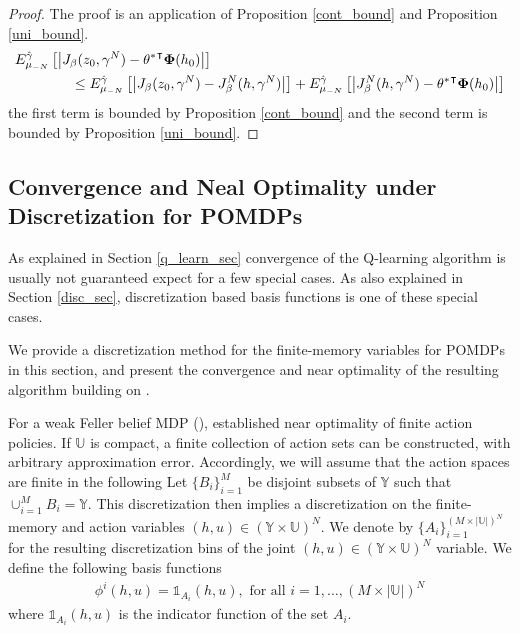 \documentclass[11pt]{article}
\begin{document}
\begin{proof}
The proof is an application of Proposition \ref{cont_bound} and Proposition \ref{uni_bound}.
\begin{align*}
&E_{\mu_{-N}}^{\hat{\gamma}}\left[\left|J_\beta({z}_0,{\gamma^N}) -{\theta^*}^\intercal {\bf \Phi}(h_0)\right|\right]\\
&\qquad\qquad\leq  E_{\mu_{-N}}^{\hat{\gamma}}\left[\left|J_\beta({z}_0,{\gamma^N}) -  J_\beta^N(h,\gamma^N) \right|\right] + E_{\mu_{-N}}^{\hat{\gamma}}\left[\left| J_\beta^N(h,\gamma^N) - {\theta^*}^\intercal {\bf \Phi}(h_0)  \right|\right]
\end{align*}
the first term is bounded by Proposition \ref{cont_bound} and the second term is bounded by Proposition \ref{uni_bound}.
\end{proof}




\subsection{Convergence and Neal Optimality under Discretization for POMDPs}
As explained in Section \ref{q_learn_sec} convergence of the Q-learning algorithm is usually not guaranteed expect for a few special cases. As also explained in Section  \ref{disc_sec}, discretization based basis functions is one of these special cases. 

We provide a discretization method for the finite-memory variables for POMDPs in this section, and present the convergence and near optimality of the resulting algorithm building on  \cite{devran2025near}.





 For a weak Feller belief MDP (\cite{FeKaZa12, KSYWeakFellerSysCont}), \cite[Theorem 3.16]{SaLiYuSpringer}   established near optimality of finite action policies. If $\mathds{U}$ is compact, a finite collection of action sets can be constructed, with arbitrary approximation error. Accordingly, we will assume that the action spaces are finite in the following
Let $\{B_i\}_{i=1}^{M}$ be disjoint subsets of $\mathds{Y}$ such that $\cup_{i=1}^{M}B_i=\mathds{Y}$. This discretization then implies a discretization on the finite-memory and action variables $(h,u)\in(\mathds{Y\times U})^N$.
We denote by $\{A_i\}_{i=1}^{(M\times |\mathds{U}|)^N}$ for the resulting discretization bins of the joint $(h,u)\in(\mathds{Y\times U})^N$ variable.
We define the following basis functions 
\begin{align*}
\phi^i(h,u)=\mathds{1}_{A_i}(h,u), \text{ for all } i=1,\dots, (M\times |\mathds{U}|)^N
\end{align*}
where $\mathds{1}_{A_i}(h,u)$ is the indicator function of the set $A_i$. 
\end{document}
